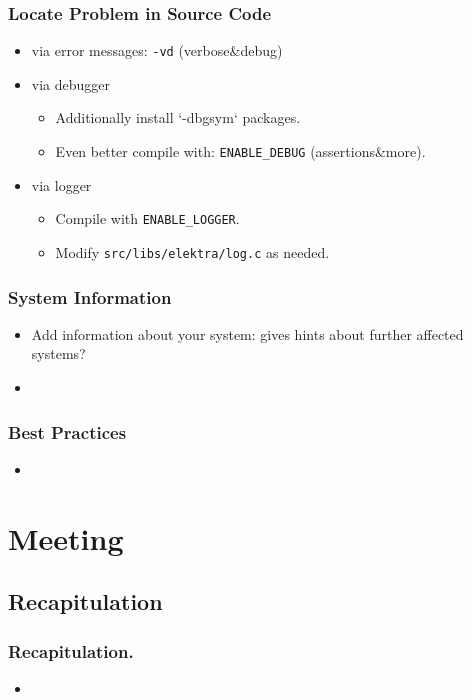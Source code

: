 \begin{frame}[fragile]
	\frametitle{Locate Problem in Source Code}
	\begin{itemize}
		\item via error messages: \verb+-vd+ (verbose\&debug)
		\item via debugger
		\begin{itemize}
			\item Additionally install `-dbgsym` packages.
			\item Even better compile with: \verb+ENABLE_DEBUG+ (assertions\&more).
		\end{itemize}
		\item via logger
		\begin{itemize}
			\item Compile with \verb+ENABLE_LOGGER+.
			\item Modify \verb+src/libs/elektra/log.c+ as needed.
		\end{itemize}
	\end{itemize}
\end{frame}

\begin{frame}
	\frametitle{System Information}
	\begin{itemize}
		\item Add information about your system: gives hints about further affected systems?
		\item 
	\end{itemize}
\end{frame}

\begin{frame}
	\frametitle{Best Practices}
	\begin{itemize}
		\item 
	\end{itemize}
\end{frame}

\section{Meeting}

\subsection{Recapitulation}

\begin{frame}
	\frametitle{Recapitulation.}
	\begin{itemize}
		\item 
	\end{itemize}
\end{frame}

